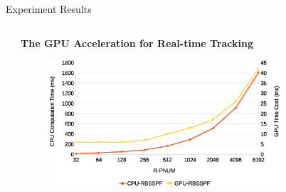 \documentclass[final,hyperref={pdfpagelabels=false}]{beamer}
\begin{document}
\begin{frame}[t]
\begin{columns}[t]
\begin{column}{.48\textwidth}
\begin{block}{Experiment Results}
\begin{columns}[c]
\begin{column}{0.4\textwidth}
\begin{itemize}
	 		
\end{itemize}
\end{column}
\begin{column}{0.55\textwidth}
\begin{framed}
\begin{center}
\textbf{The GPU Acceleration for Real-time Tracking}
\end{center}
\begin{figure}
 \centering
 \includegraphics[width=0.85\textwidth]{./img/time.eps}
\end{figure}
\end{framed}
\end{column}
\end{columns}


\end{block}


\end{column} %

\begin{column}{.015\textwidth}\end{column} %

\end{columns} %

\end{frame} %
\end{document}
